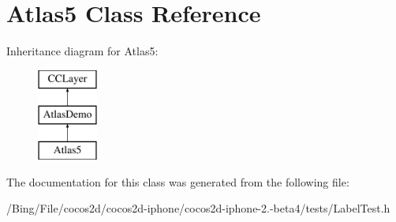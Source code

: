 \hypertarget{interface_atlas5}{\section{Atlas5 Class Reference}
\label{interface_atlas5}
}
Inheritance diagram for Atlas5\-:\begin{figure}[H]
\begin{center}
\leavevmode
\includegraphics[height=3.000000cm]{interface_atlas5}
\end{center}
\end{figure}


The documentation for this class was generated from the following file\-:\begin{DoxyCompactItemize}
\item 
/\-Bing/\-File/cocos2d/cocos2d-\/iphone/cocos2d-\/iphone-\/2.-\/beta4/tests/Label\-Test.\-h\end{DoxyCompactItemize}
